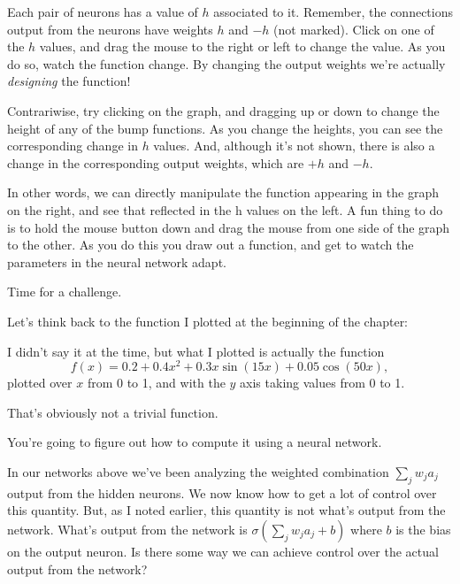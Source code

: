 \documentclass[a4paper,twoside,10pt]{book}
\begin{document}
Each pair of neurons has a value of $h$ associated to it. Remember, the connections output from the neurons have weights $h$ and $-h$ (not marked). Click on one of the $h$ values, and drag the mouse to the right or left to change the value. As you do so, watch the function change. By changing the output weights we're actually \textit{designing} the function!

Contrariwise, try clicking on the graph, and dragging up or down to change the height of any of the bump functions. As you change the heights, you can see the corresponding change in $h$ values. And, although it's not shown, there is also a change in the corresponding output weights, which are $+h$ and $-h$.

In other words, we can directly manipulate the function appearing in the graph on the right, and see that reflected in the h values on the left. A fun thing to do is to hold the mouse button down and drag the mouse from one side of the graph to the other. As you do this you draw out a function, and get to watch the parameters in the neural network adapt.

Time for a challenge.

Let's think back to the function I plotted at the beginning of the chapter:
\begin{center} 
\end{center}
I didn't say it at the time, but what I plotted is actually the function
\begin{equation}
f(x)=0.2+0.4x^2+0.3x\sin(15x)+0.05\cos(50x),\label{eq:113}
\end{equation}
plotted over $x$ from 0 to 1, and with the $y$ axis taking values from 0 to 1.

That's obviously not a trivial function.

You're going to figure out how to compute it using a neural network.

In our networks above we've been analyzing the weighted combination $\sum_jw_ja_j$ output from the hidden neurons. We now know how to get a lot of control over this quantity. But, as I noted earlier, this quantity is not what's output from the network. What's output from the network is $\sigma(\sum_jw_ja_j+b)$ where $b$ is the bias on the output neuron. Is there some way we can achieve control over the actual output from the network?
\end{document}
